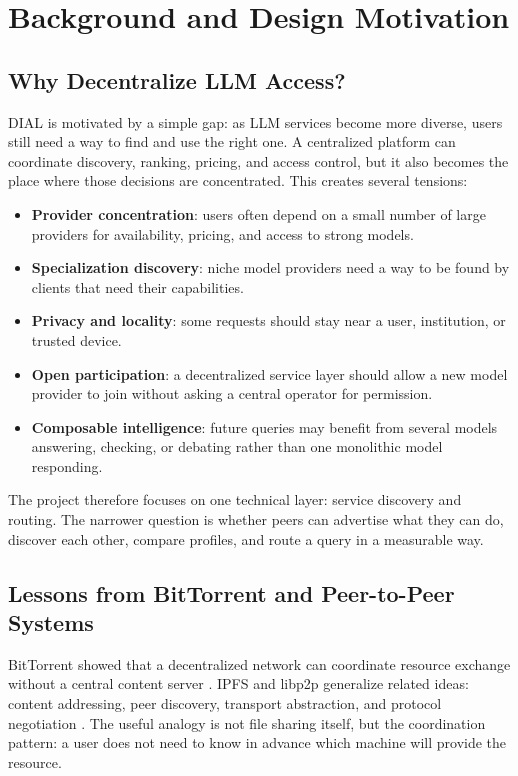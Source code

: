 \section{Background and Design Motivation}

\subsection{Why Decentralize LLM Access?}

DIAL is motivated by a simple gap: as LLM services become more diverse, users
still need a way to find and use the right one. A centralized platform can
coordinate discovery, ranking, pricing, and access control, but it also becomes
the place where those decisions are concentrated. This creates several
tensions:

\begin{itemize}
  \item \textbf{Provider concentration}: users often depend on a small number
  of large providers for availability, pricing, and access to strong models.
  \item \textbf{Specialization discovery}: niche model providers need a way to
  be found by clients that need their capabilities.
  \item \textbf{Privacy and locality}: some requests should stay near a user,
  institution, or trusted device.
  \item \textbf{Open participation}: a decentralized service layer should allow
  a new model provider to join without asking a central operator for
  permission.
  \item \textbf{Composable intelligence}: future queries may benefit from
  several models answering, checking, or debating rather than one monolithic
  model responding.
\end{itemize}

The project therefore focuses on one technical layer: service discovery and
routing. The narrower question is whether peers can advertise what they can do,
discover each other, compare profiles, and route a query in a measurable way.

\subsection{Lessons from BitTorrent and Peer-to-Peer Systems}

BitTorrent showed that a decentralized network can coordinate resource exchange
without a central content server \citep{cohen2003bittorrent}. IPFS and libp2p
generalize related ideas: content addressing, peer discovery, transport
abstraction, and protocol negotiation \citep{benet2014ipfs,libp2p}. The useful
analogy is not file sharing itself, but the coordination pattern: a user does
not need to know in advance which machine will provide the resource.

